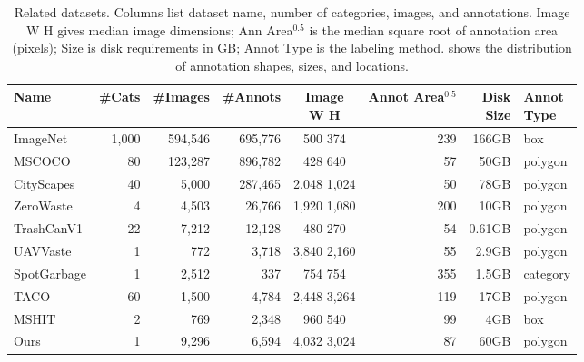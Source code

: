 \documentclass{article}
\begin{document}
\begin{table*}[t]
\caption{Related datasets.
%
Columns list dataset name, number of categories, images, and annotations.
Image W \times{} H gives median image dimensions;
Ann Area$^{0.5}$ is the median square root of annotation area (pixels);
Size is disk requirements in GB; 
Annot Type is the labeling method.
 shows the distribution of annotation shapes, sizes, and locations.
}
\label{tab:related_datasets}
\begin{tabular}{lrrrcrrl}
\toprule
Name & \#Cats & \#Images & \#Annots & \makecell{Image\\W \times{} H} & \makecell{Annot\\Area$^{0.5}$} & \makecell{Disk\\Size} & \makecell{Annot\\Type} \\
\midrule
ImageNet\cite{ILSVRC15}    & 1,000 & 594,546 & 695,776 & 500 \times{} 374 & 239 & 166GB & box \\
MSCOCO\cite{lin_microsoft_2014}      & 80 & 123,287 & 896,782 & 428 \times{} 640 & 57 & 50GB & polygon \\
CityScapes\cite{cordts2015cityscapes}  & 40 & 5,000 & 287,465 & 2,048 \times{} 1,024 & 50 & 78GB & polygon \\
ZeroWaste \cite{bashkirova_zerowaste_2022}   & 4 & 4,503 & 26,766 & 1,920 \times{} 1,080 & 200 & 10GB & polygon \\
TrashCanV1\cite{hong2020trashcansemanticallysegmenteddatasetvisual}  & 22 & 7,212 & 12,128 & 480 \times{} 270 & 54 & 0.61GB & polygon \\
UAVVaste\cite{rs13050965}    & 1 & 772 & 3,718 & 3,840 \times{} 2,160 & 55 & 2.9GB & polygon \\
SpotGarbage\cite{mittal2016spotgarbage} & 1 & 2,512 & 337 & 754 \times{} 754 & 355 & 1.5GB & category \\
TACO\cite{proenca_taco_2020}        & 60 & 1,500 & 4,784 & 2,448 \times{} 3,264 & 119 & 17GB & polygon \\
MSHIT\cite{mshit_2020}       & 2 & 769 & 2,348 & 960 \times{} 540 & 99 & 4GB & box \\
Ours        & 1 & 9,296 & 6,594 & 4,032 \times{} 3,024 & 87 & 60GB & polygon \\
\bottomrule
\end{tabular}
\end{table*}
\end{document}
